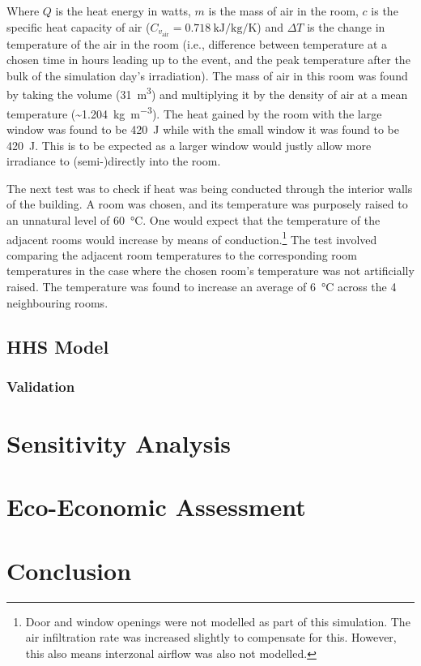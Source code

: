 Where $Q$ is the heat energy in watts, $m$ is the mass of air in the room, $c$ is the specific heat capacity of air ($C_{v_\text{air}} = \qty{0.718}{\kilo\joule\per\kilo\gram\per\kelvin}$) and $\Delta T$ is the change in temperature of the air in the room (i.e., difference between temperature at a chosen time in hours leading up to the event, and the peak temperature after the bulk of the simulation day's irradiation). The mass of air in this room was found by taking the volume (\qty{31}{\meter\cubed}) and multiplying it by the density of air at a mean temperature (\sim \qty{1.204}{\kilo\gram\per\cubic\meter}). 
The heat gained by the room with the large window was found to be \qty{420}{\joule} while with the small window it was found to be \qty{420}{\joule}. This is to be expected as a larger window would justly allow more irradiance to (semi-)directly into the room. 

The next test was to check if heat was being conducted through the interior walls of the building. A room was chosen, and its temperature was purposely raised to an unnatural level of \qty{60}{\celsius}. One would expect that the temperature of the adjacent rooms would increase by means of conduction.\footnote{Door and window openings were not modelled as part of this simulation. The air infiltration rate was increased slightly to compensate for this. However, this also means interzonal airflow was also not modelled.} The test involved comparing the adjacent room temperatures to the corresponding room temperatures in the case where the chosen room's temperature was not artificially raised. The temperature was found to increase an average of \qty{6}{\celsius} across the 4 neighbouring rooms. 
\subsection{HHS Model}\label{sec:methodheatingsys}
\subsubsection{Validation} \label{subsubsec:validation}


\section{Sensitivity Analysis}

\section{Eco-Economic Assessment}\label{sec:methodecoeco}

\section{Conclusion}\label{sec:methodconclusion}


